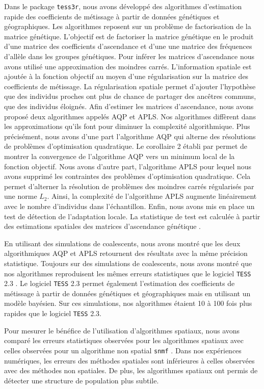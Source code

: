 \documentclass[12pt,a4paper,twoside]{ugathesis}
\begin{document}
Dans le package \texttt{tess3r}, nous avons développé des algorithmes d'estimation
rapide des coefficients de métissage à partir de données génétiques et
géographiques. Les algorithmes reposent sur un problème de factorisation de la
matrice génétique. L'objectif est de factoriser la matrice génétique en le
produit d'une matrice des coefficients d'ascendance et d'une une matrice des
fréquences d'allèle dans les groupes génétiques. Pour inférer les matrices
d'ascendance nous avons utilisé une approximation des moindres carrés.
L'information spatiale est ajoutée à la fonction objectif au moyen d'une
régularisation sur la matrice des coefficients de métissage. La régularisation
spatiale permet d'ajouter l'hypothèse que des individus proches ont plus de
chance de partager des ancêtres communs, que des individus éloignés. Afin
d'estimer les matrices d'ascendance, nous avons proposé deux algorithmes appelés
AQP et APLS. Nos algorithmes diffèrent dans les approximations qu'ils font pour
diminuer la complexité algorithmique. Plus précisément, nous avons d'une part
l'algorithme AQP qui alterne des résolutions de problèmes d'optimisation
quadratique. Le corollaire 2 établi par \citet{Grippo_2000} permet de montrer la
convergence de l'algorithme AQP vers un minimum local de la fonction objectif.
Nous avons d'autre part, l'algorithme APLS pour lequel nous avons supprimé les
contraintes des problèmes d'optimisation quadratique. Cela permet d'alterner la
résolution de problèmes des moindres carrés régularisés par une norme \(L_{2}\).
Ainsi, la complexité de l'algorithme APLS augmente linéairement avec le nombre
d'individus dans l'échantillon. Enfin, nous avons mis en place un test de
détection de l'adaptation locale. La statistique de test est calculée à partir
des estimations spatiales des matrices d'ascendance génétique \citep{Martins_2016}.

En utilisant des simulations de coalescents, nous avons montré que les deux
algorithmiques AQP et APLS retournent des résultats avec la même précision
statistique. Toujours sur des simulations de coalescents, nous avons montré que
nos algorithmes reproduisent les mêmes erreurs statistiques que le logiciel
\texttt{TESS} 2.3 \citep{CHEN_2007}. Le logiciel \texttt{TESS} 2.3 permet également l'estimation
des coefficients de métissage à partir de données génétiques et géographiques mais
en utilisant un modèle bayésien. Sur ces simulations, nos algorithmes étaient 10
à 100 fois plus rapides que le logiciel \texttt{TESS} 2.3.

Pour mesurer le bénéfice de l'utilisation d'algorithmes spatiaux, nous avons
comparé les erreurs statistiques observées pour les algorithmes spatiaux avec
celles observées pour un algorithme non spatial \texttt{snmf} \citep{Frichot_2014}. Dans
nos expériences numériques, les erreurs des méthodes spatiales sont inférieures
à celles observées avec des méthodes non spatiales. De plus, les algorithmes
spatiaux ont permis de détecter une structure de population plus subtile.
\end{document}

